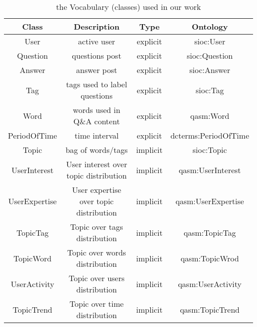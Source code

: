 \begin{sidewaystable}
    \centering
    \begin{tabular}{|c|c|c|c|}
    \hline
    Class &  Description & Type & Ontology \\ \hline
    User  & active user & explicit &  sioc:User \\ \hline
    Question & questions post & explicit & sioc:Question \\ \hline
    Answer  & answer post & explicit & sioc:Answer \\ \hline
    Tag & tags used to label questions & explicit & sioc:Tag \\ \hline
    Word & words used in Q\&A content & explicit & qasm:Word \\ \hline
    PeriodOfTime & time interval & explicit & dcterms:PeriodOfTime \\ \hline
    Topic & bag of words/tags & implicit & sioc:Topic \\ \hline   
    UserInterest& User interest over topic distribution & implicit& qasm:UserInterest\\ \hline
    UserExpertise & User expertise over topic distribution &implicit& qasm:UserExpertise \\ \hline
    TopicTag &Topic over tags distribution&implicit &qasm:TopicTag \\ \hline
    
    TopicWord&Topic over words distribution &implicit & qasm:TopicWrod\\ \hline
    
    UserActivity&Topic over users distribution & implicit &qasm:UserActivity \\ \hline
    
    TopicTrend &Topic over time distribution &implicit & qasm:TopicTrend\\ \hline
          
    \end{tabular}
    \caption{the Vocabulary (classes) used in our work}
    \label{tab:qaontoclass}
\end{sidewaystable}


